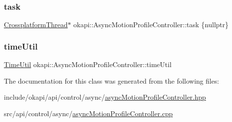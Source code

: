 \subsubsection{\texorpdfstring{task}{task}}
{\footnotesize\ttfamily \mbox{\hyperlink{classCrossplatformThread}{Crossplatform\+Thread}}$\ast$ okapi\+::\+Async\+Motion\+Profile\+Controller\+::task \{nullptr\}\hspace{0.3cm}{\ttfamily [protected]}}

\mbox{\label{classokapi_1_1AsyncMotionProfileController_a82610b4101b963cbd314e6c287be4ec4}} 
\subsubsection{\texorpdfstring{timeUtil}{timeUtil}}
{\footnotesize\ttfamily \mbox{\hyperlink{classokapi_1_1TimeUtil}{Time\+Util}} okapi\+::\+Async\+Motion\+Profile\+Controller\+::time\+Util\hspace{0.3cm}{\ttfamily [protected]}}



The documentation for this class was generated from the following files\+:\begin{DoxyCompactItemize}
\item 
include/okapi/api/control/async/\mbox{\hyperlink{asyncMotionProfileController_8hpp}{async\+Motion\+Profile\+Controller.\+hpp}}\item 
src/api/control/async/\mbox{\hyperlink{asyncMotionProfileController_8cpp}{async\+Motion\+Profile\+Controller.\+cpp}}\end{DoxyCompactItemize}
